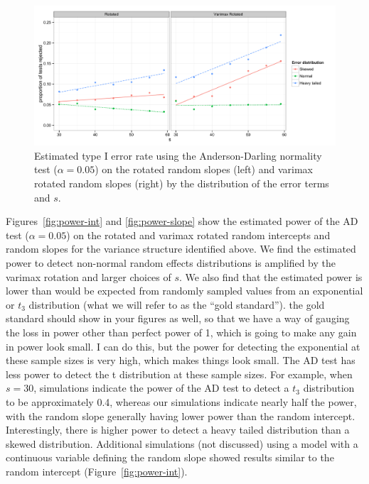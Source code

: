 \documentclass[12pt]{article} %
\newcommand{\hh}[1]{{\color{orange} #1}}
\newcommand{\al}[1]{{\color{red} #1}}
\begin{document}
\begin{figure}
	\centering
	\includegraphics[width=\textwidth]{ad_slope_results.pdf}
	\caption{\label{fig:results-slope} Estimated type I error rate using the Anderson-Darling normality test ($\alpha = 0.05$) on the rotated random slopes (left) and varimax rotated random slopes (right) by the distribution of the error terms and $s$.}
\end{figure}

Figures~\ref{fig:power-int} and \ref{fig:power-slope} show the estimated power of the AD test ($\alpha = 0.05$) on the rotated and varimax rotated random intercepts and random slopes for the variance structure identified above. We find the estimated power to detect non-normal random effects distributions is amplified by the varimax rotation and larger choices of $s$. We also find that the estimated power is lower than would be expected from randomly sampled values from an exponential or $t_3$ distribution (what we will refer to as the ``gold standard''). 
\hh{the gold standard should show in your figures as well, so that we have a way of gauging the loss in power other than perfect power of 1, which is going to make any gain in power look small.} 
\al{I can do this, but the power for detecting the exponential at these sample sizes is very high, which makes things look small. The AD test has less power to detect the t distribution at these sample sizes.}
For example, when $s=30$, simulations indicate the power of the AD test to detect a $t_3$ distribution to be approximately 0.4, whereas our simulations indicate nearly half the power, with the random slope generally having lower power than the random intercept. Interestingly,  there is higher power to detect a heavy tailed distribution than a skewed distribution.  Additional simulations (not discussed) using a model with a continuous variable defining the random slope showed results similar to the random intercept (Figure~\ref{fig:power-int}).
\end{document}
